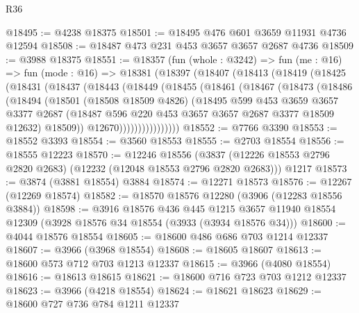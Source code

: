 \begin{lexlean}{R36}
\begin{coremodule}
@18495 := @4238 @18375
@18501 := @18495 @476 @601 @3659 @11931 @4736 @12594
@18508 := @18487 @473 @231 @453 @3657 @3657 @2687 @4736
@18509 := @3988 @18375
@18551 := @18357
    (fun (whole : @3242) =>
    fun (me : @16) =>
    fun (mode : @16) =>
    @18381
      (@18397
        (@18407
          (@18413
            (@18419
              (@18425
                (@18431
                  (@18437
                    (@18443
                      (@18449
                        (@18455
                          (@18461
                            (@18467
                              (@18473
                                (@18486
                                  (@18494
                                    (@18501
                                      (@18508 @18509 @4826)
                                      (@18495
                                        @599
                                        @453
                                        @3659
                                        @3657
                                        @3377
                                        @2687
                                        (@18487
                                          @596
                                          @220
                                          @453
                                          @3657
                                          @3657
                                          @2687
                                          @3377
                                          @18509
                                          @12632)
                                        @18509))
                                    @12670))))))))))))))))
@18552 := @7766 @3390
@18553 := @18552 @3393
@18554 := @3560 @18553
@18555 := @2703 @18554
@18556 := @18555 @12223
@18570 := @12246
    @18556
    (@3837 (@12226 @18553 @2796 @2820 @2683) (@12232 (@12048 @18553 @2796 @2820 @2683)))
    @1217
@18573 := @3874 (@3881 @18554) @3884
@18574 := @12271 @18573
@18576 := @12267 (@12269 @18574)
@18582 := @18570 @18576 @12280 (@3906 (@12283 @18556 @3884))
@18598 := @3916
    @18576
    @436
    @445
    @1215
    @3657
    @11940
    @18554
    @12309
    (@3928 @18576 @34 @18554 (@3933 (@3934 @18576 @34)))
@18600 := @4044 @18576 @18554
@18605 := @18600 @486 @686 @703 @1214 @12337
@18607 := @3966 (@3968 @18554)
@18608 := @18605 @18607
@18613 := @18600 @573 @712 @703 @1213 @12337
@18615 := @3966 (@4080 @18554)
@18616 := @18613 @18615
@18621 := @18600 @716 @723 @703 @1212 @12337
@18623 := @3966 (@4218 @18554)
@18624 := @18621 @18623
@18629 := @18600 @727 @736 @784 @1211 @12337

\end{coremodule}
\end{lexlean}
